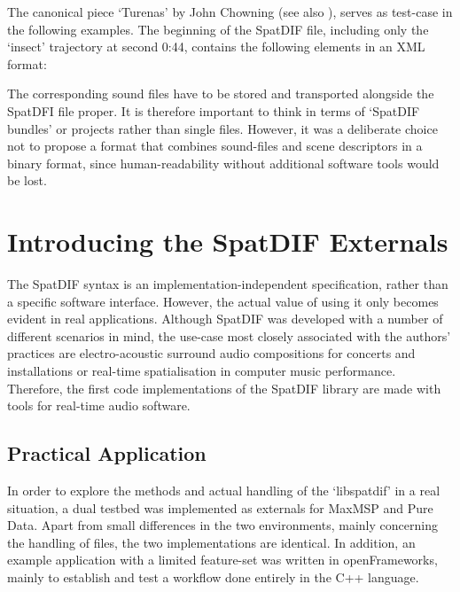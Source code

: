 \documentclass{article}
\begin{document}
The canonical piece `Turenas' by John Chowning (see also \cite{Peters:2013SpatDifCMJ}), serves as test-case in the following examples. 
The beginning of the SpatDIF file, including only the `insect' trajectory at second 0:44, contains the following elements in an XML format:

 

The corresponding sound files have to be stored and transported alongside the SpatDFI file proper. 
It is therefore important to think in terms of ‘SpatDIF bundles’ or projects rather than single files. 
However, it was a deliberate choice not to propose a format that combines sound-files and scene descriptors in a binary format, since human-readability without additional software tools would be lost.

\section{Introducing the SpatDIF Externals}\label{sec:Intro}

The SpatDIF syntax is an implementation-independent specification, rather than a specific software interface. 
However, the actual value of using it only becomes evident in real applications. 
Although SpatDIF was developed with a number of different scenarios in mind, the use-case most closely associated with the authors' practices are electro-acoustic surround audio compositions for concerts and installations or real-time spatialisation in computer music performance.
Therefore, the first code implementations of the SpatDIF library are made with tools for real-time audio software.

\subsection{Practical Application}\label{practical_usage}

In order to explore the methods and actual handling of the `libspatdif' in a real situation, a dual testbed was implemented as externals for MaxMSP and Pure Data.
Apart from small differences in the two environments, mainly concerning the handling of files, the two implementations are identical.
In addition, an example application with a limited feature-set was written in openFrameworks, mainly to establish and test a workflow done entirely in the C++ language.
\end{document}
